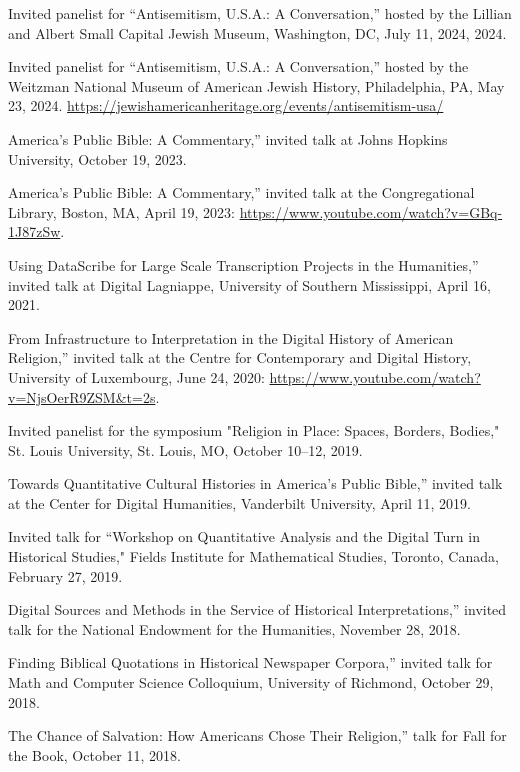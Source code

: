 \documentclass[11pt]{article}
\begin{document}
Invited panelist for ``Antisemitism, U.S.A.: A Conversation,'' hosted by the 
Lillian and Albert Small Capital Jewish Museum, Washington, DC, July 11, 2024, 
2024. 

Invited panelist for ``Antisemitism, U.S.A.: A Conversation,'' hosted by the 
Weitzman National Museum of American Jewish History, Philadelphia, PA, May 23, 
2024. \url{https://jewishamericanheritage.org/events/antisemitism-usa/}

\noindent{}America's Public Bible: A Commentary,'' invited talk at Johns 
Hopkins University, October 19, 2023.

\noindent{}America's Public Bible: A Commentary,'' invited talk at the Congregational Library, Boston, MA, April 19, 2023: \url{https://www.youtube.com/watch?v=GBq-1J87zSw}.

\noindent{}Using DataScribe for Large Scale Transcription Projects in the Humanities,'' invited talk at Digital Lagniappe, University of Southern Mississippi, April 16, 2021.

\noindent{}From Infrastructure to Interpretation in the Digital History of American Religion,'' invited talk at the Centre for Contemporary and Digital History, University of Luxembourg, June 24, 2020: \url{https://www.youtube.com/watch?v=NjsOerR9ZSM&t=2s}.

Invited panelist for the symposium "Religion in Place: Spaces, Borders, Bodies," St. Louis University, St. Louis, MO, October 10--12, 2019.

\noindent{}Towards Quantitative Cultural Histories in America's Public Bible,'' invited talk at the Center for Digital Humanities, Vanderbilt University, April 11, 2019.

Invited talk for ``Workshop on Quantitative Analysis and the Digital Turn in Historical Studies," Fields Institute for Mathematical Studies, Toronto, Canada, February 27, 2019.

\noindent{}Digital Sources and Methods in the Service of Historical Interpretations,'' invited talk for the National Endowment for the Humanities, November 28, 2018.

\noindent{}Finding Biblical Quotations in Historical Newspaper Corpora,'' invited talk for Math and Computer Science Colloquium, University of Richmond, October 29, 2018.

\noindent{}The Chance of Salvation: How Americans Chose Their Religion,'' talk for Fall for the Book, October 11, 2018.
\end{document}
